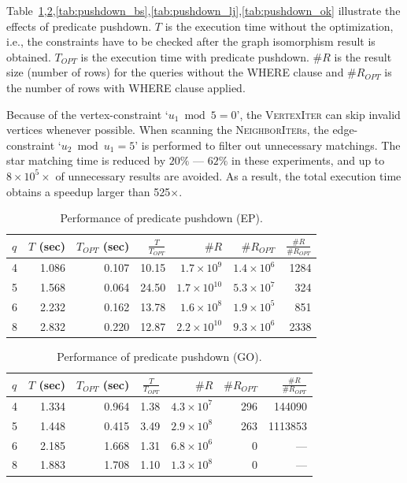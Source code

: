 Table~\ref{tab:pushdown_ep},\ref{tab:pushdown_go},\ref{tab:pushdown_bs},\ref{tab:pushdown_lj},\ref{tab:pushdown_ok} illustrate the effects of predicate pushdown.
$T$ is the execution time without the optimization, i.e., the constraints have to be checked after the graph isomorphism result is obtained.
$T_{OPT}$ is the execution time with predicate pushdown.
$\#R$ is the result size (number of rows) for the queries without the WHERE clause and $\#R_{OPT}$ is the number of rows with WHERE clause applied.

Because of the vertex-constraint `$u_1 \bmod 5 = 0$',
the \textsc{VertexIter} can skip invalid vertices whenever possible.
When scanning the \textsc{NeighborIter}s,
the edge-constraint `$u_2 \bmod u_1 = 5$' is performed to filter out unnecessary matchings.
The star matching time is reduced by $20\%$ --- $62\%$ in these experiments,
and up to $8 \times 10^5 \times$ of unnecessary results are avoided.
As a result, the total execution time obtains a speedup larger than 525$\times$.
\begin{table}
  \caption{Performance of predicate pushdown (EP).}\label{tab:pushdown_ep}
  \begin{tabular}{lrrrrrr}
    \toprule
    $q$ & \parbox{5mm}{$T$ (sec)} & \parbox{5mm}{$T_{OPT}$ (sec)} & $\frac{T}{T_{OPT}}$ & $\#R$ & $\#R_{OPT}$ & $\frac{\#R}{\#R_{OPT}}$ \\
     & 1.086 &     0.107 &     10.15 & $1.7 \times 10^9$   &   $1.4 \times 10^6$ &            1284 \\
    5 & 1.568 &     0.064 &     24.50 & $1.7 \times 10^{10}$ &   $5.3 \times 10^7$ &             324 \\
    6 & 2.232 &     0.162 &     13.78 & $1.6 \times 10^8$  &        $1.9 \times 10^5$ &             851 \\
    8 & 2.832 &     0.220 &     12.87 & $2.2 \times 10^{10}$ &   $9.3 \times 10^6$ &            2338 \\
    \bottomrule
  \end{tabular}
\end{table}

\begin{table}
  \caption{Performance of predicate pushdown (GO).}\label{tab:pushdown_go}
  \begin{tabular}{lrrrrrr}
    \toprule
    $q$ & \parbox{5mm}{$T$ (sec)} & \parbox{5mm}{$T_{OPT}$ (sec)} & $\frac{T}{T_{OPT}}$ & $\#R$ & $\#R_{OPT}$ & $\frac{\#R}{\#R_{OPT}}$ \\
     & 1.334 &     0.964 &     1.38 & $4.3\times10^7$ &           296 &               144090 \\
    5 & 1.448 &     0.415 &     3.49 & $2.9 \times 10^8$ &           263 &              1113853 \\
    6 & 2.185 &     1.668 &     1.31 & $6.8 \times 10^6$ &             0 & --- \\
    8 & 1.883 &     1.708 &     1.10 & $1.3\times10^8$ &             0 & --- \\
    \bottomrule
  \end{tabular}
\end{table}

